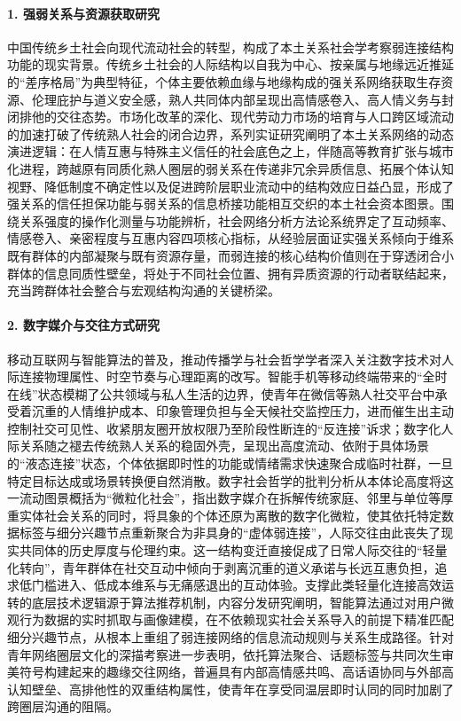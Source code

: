 \paragraph{1. 强弱关系与资源获取研究}
中国传统乡土社会向现代流动社会的转型，构成了本土关系社会学考察弱连接结构功能的现实背景。传统乡土社会的人际结构以自我为中心、按亲属与地缘远近推延的“差序格局”为典型特征，个体主要依赖血缘与地缘构成的强关系网络获取生存资源、伦理庇护与道义安全感，熟人共同体内部呈现出高情感卷入、高人情义务与封闭排他的交往态势\cite{Fei2012}。市场化改革的深化、现代劳动力市场的培育与人口跨区域流动的加速打破了传统熟人社会的闭合边界，系列实证研究阐明了本土关系网络的动态演进逻辑：在人情互惠与特殊主义信任的社会底色之上，伴随高等教育扩张与城市化进程，跨越原有同质化熟人圈层的弱关系在传递非冗余异质信息、拓展个体认知视野、降低制度不确定性以及促进跨阶层职业流动中的结构效应日益凸显，形成了强关系的信任担保功能与弱关系的信息桥接功能相互交织的本土社会资本图景\cite{ZSHK200403011,Bian2021}。围绕关系强度的操作化测量与功能辨析，社会网络分析方法论系统界定了互动频率、情感卷入、亲密程度与互惠内容四项核心指标，从经验层面证实强关系倾向于维系既有群体的内部凝聚与既有资源存量，而弱连接的核心结构价值则在于穿透闭合小群体的信息同质性壁垒，将处于不同社会位置、拥有异质资源的行动者联结起来，充当跨群体社会整合与宏观结构沟通的关键桥梁\cite{Lin2009}。

\paragraph{2. 数字媒介与交往方式研究}
移动互联网与智能算法的普及，推动传播学与社会哲学学者深入关注数字技术对人际连接物理属性、时空节奏与心理距离的改写。智能手机等移动终端带来的“全时在线”状态模糊了公共领域与私人生活的边界，使青年在微信等熟人社交平台中承受着沉重的人情维护成本、印象管理负担与全天候社交监控压力，进而催生出主动控制社交可见性、收紧朋友圈开放权限乃至阶段性断连的“反连接”诉求；数字化人际关系随之褪去传统熟人关系的稳固外壳，呈现出高度流动、依附于具体场景的“液态连接”状态，个体依据即时性的功能或情绪需求快速聚合成临时社群，一旦特定目标达成或场景转换便自然消散\cite{GJXW201902002,Peng2021}。数字社会哲学的批判分析从本体论高度将这一流动图景概括为“微粒化社会”，指出数字媒介在拆解传统家庭、邻里与单位等厚重实体社会关系的同时，将具象的个体还原为离散的数字化微粒，使其依托特定数据标签与细分兴趣节点重新聚合为非具身的“虚体弱连接”，人际交往由此丧失了现实共同体的历史厚度与伦理约束\cite{Lan2022}。这一结构变迁直接促成了日常人际交往的“轻量化转向”，青年群体在社交互动中倾向于剥离沉重的道义承诺与长远互惠负担，追求低门槛进入、低成本维系与无痛感退出的互动体验\cite{Hu2019}。支撑此类轻量化连接高效运转的底层技术逻辑源于算法推荐机制，内容分发研究阐明，智能算法通过对用户微观行为数据的实时抓取与画像建模，在不依赖现实社会关系导入的前提下精准匹配细分兴趣节点，从根本上重组了弱连接网络的信息流动规则与关系生成路径\cite{XJSF202001015}。针对青年网络圈层文化的深描考察进一步表明，依托算法聚合、话题标签与共同次生审美符号构建起来的趣缘交往网络，普遍具有内部高情感共鸣、高话语协同与外部高认知壁垒、高排他性的双重结构属性，使青年在享受同温层即时认同的同时加剧了跨圈层沟通的阻隔\cite{Cai2018}。

